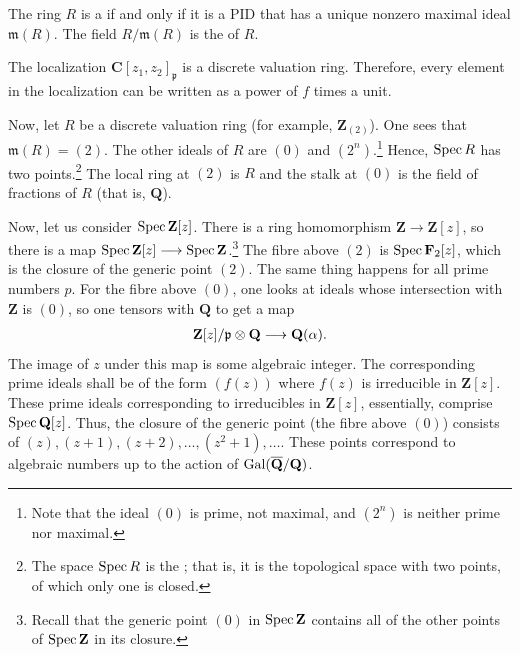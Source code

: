 \documentclass [11 pt, oneside] {article}
\begin{document}
\begin{definition}[ ]\label{}
The ring $R$ is a  if and only if it is a PID that has a unique nonzero maximal ideal $\mathfrak{m}(R)$. The field $R/\mathfrak{m}(R)$ is the  of $R$. 
\end{definition}

\begin{remark}
The localization $\mathbf{C}[z_1,z_2]_{\mathfrak{p}}$ is a discrete valuation ring. Therefore, every element in the localization can be written as a power of $f$ times a unit.	
\end{remark}

Now, let $R$ be a discrete valuation ring (for example, $\mathbf{Z}_{(2)}$). One sees that $\mathfrak{m}(R) =  (2) $. The other ideals of $R$ are $(0)$ and $(2^n)$.\footnote{Note that the ideal $(0)$ is prime, not maximal, and $(2^n)$ is neither prime nor maximal.} Hence, $\operatorname{Spec} R$ has two points.\footnote{The space $\operatorname{Spec} R$ is the ; that is, it is the topological space with two points, of which only one is closed.} The local ring at $(2)$ is $R$ and the stalk at $(0)$ is the field of fractions of $R$ (that is, $\mathbf{Q}$).

Now, let us consider $\operatorname{Spec} \mathbf{Z}[z] $. There is a ring homomorphism $\mathbf{Z}\longrightarrow \mathbf{Z}[z]$, so there is a map $\operatorname{Spec} \mathbf{Z}[z] \longrightarrow \operatorname{Spec} \mathbf{Z}$.\footnote{Recall that the generic point $(0)$ in $\operatorname{Spec} \mathbf{Z}$ contains all of the other points of $\operatorname{Spec}\mathbf{Z}$ in its closure.} The fibre above $(2)$ is $\operatorname{Spec}\mathbf{F}_{2}[z]$, which is the closure of the generic point $(2)$. The same thing happens for all prime numbers $p$. For the fibre above $(0)$, one looks at ideals whose intersection with $\mathbf{Z}$ is $(0)$, so one tensors with $\mathbf{Q}$ to get a map
\begin{align*}
	\mathbf{Z}[z]/\mathfrak{p}\otimes \mathbf{Q}\longrightarrow \mathbf{Q}(\alpha). 
\end{align*}
The image of $z$ under this map is some algebraic integer. The corresponding prime ideals shall be of the form $(f(z))$ where $f(z) $ is irreducible in $\mathbf{Z}[z]$. These prime ideals corresponding to irreducibles in $\mathbf{Z}[z]$, essentially, comprise $\operatorname{Spec} \mathbf{Q}[z]$. Thus, the closure of the generic point (the fibre above $(0)$) consists of $(z),  (z+1), (z+2),\hdots,  (z^2+1),\hdots$. These points correspond to algebraic numbers up to the action of $\operatorname{Gal} (\overline{\mathbf{Q}}/\mathbf{Q})$.
\end{document}
